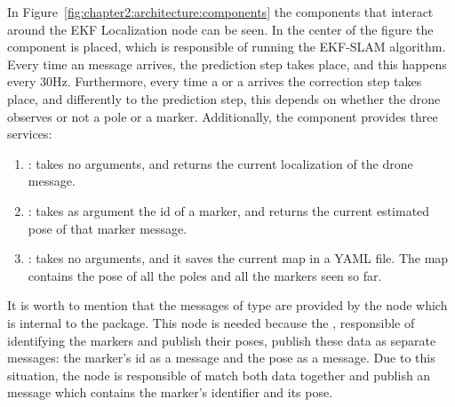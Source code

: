 In Figure~\ref{fig:chapter2:architecture:components} the components that interact around the EKF Localization node can be seen. In the center of the figure the  component is placed, which is responsible of running the EKF-SLAM algorithm. Every time an  message arrives, the prediction step takes place, and this happens every 30Hz. Furthermore, every time a  or a  arrives the correction step takes place, and differently to the prediction step, this depends on whether the drone observes or not a pole or a marker. Additionally, the  component provides three services:
\begin{enumerate}
    \item {}: takes no arguments, and returns the current localization of the drone  message.
    \item {}: takes as argument the id of a marker, and returns the current estimated pose of that marker message.
    \item {}: takes no arguments, and it saves the current map in a YAML file. The map contains the pose of all the poles and all the markers seen so far.
\end{enumerate}

It is worth to mention that the messages of type  are provided by the  node which is internal to the  package. This node is needed because the , responsible of identifying the markers and publish their poses, publish these data as separate messages: the marker's id as a  message and the pose as a  message. Due to this situation, the  node is responsible of match both data together and publish an  message which contains the marker's identifier and its pose.\\

